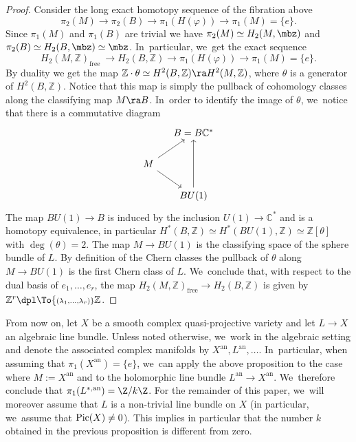 \begin{proof}
Consider the long exact homotopy sequence of the fibration above
\[
\pi_2(M) \to \pi_2(B) \to \pi_1(H(\varphi)) \to \pi_1(M)= \{e\}.
\]
Since $\pi_1(M)$ and $\pi_1(B)$ are trivial we have $\pi_2(M) \simeq H_2(M,\mbz)$ and $\pi_2(B) \simeq H_2(B,\mbz) \simeq \mbz$. In~particular, we~get the exact sequence
\[
H_2(M,\mathbb{Z})_{\text{free}}\ \to H_2(B,\mathbb{Z}) \to \pi_1(H(\varphi)) \to \pi_1(M) = \{e\}.
\]
By duality we get the map $\mathbb{Z} \cdot \theta \simeq H^2(B,\mathbb{Z}) \ra H^2(M,\mathbb{Z})$, where $\theta$ is a generator of $H^2(B,\mathbb{Z})$. Notice that this map is simply the pullback of cohomology classes along the classifying map $M \ra B$. In~order to identify the image of $\theta$, we~notice that there is a commutative diagram
\[
\begin{tikzcd}[column sep=small]
& B = B\mathbb{C}^* \\
M \arrow[ur] \arrow[dr] & \\
& BU(1) \arrow[uu]
\end{tikzcd}
\]
The map $BU(1) \to B$ is induced by the inclusion $U(1) \to \mathbb{C}^*$ and is a homotopy equivalence, in particular $H^*(B, \mathbb{Z}) \simeq H^*(BU(1),\mathbb{Z}) \simeq \mathbb{Z}[\theta]$ with $\deg(\theta) = 2$. The map $M \to BU(1)$ is the classifying space of the sphere bundle of $L$. By definition of the Chern classes the pullback of $\theta$ along $M \to BU(1)$ is the first Chern class of $L$. We~conclude that, with respect to the dual basis of $e_1,\ldots, e_r$, the map $H_2(M,\mathbb{Z})_{\text{free}} \to H_2(B,\mathbb{Z})$ is given by $\mathbb{Z}^r \dpl\To{\scriptstyle(\lambda_1, \ldots, \lambda_r)} \mathbb{Z}$.
\end{proof}

From now on, let $X$ be a smooth complex quasi-projective variety and let $L \to X$ an algebraic line bundle. Unless noted otherwise, we~work in the algebraic setting and denote the associated complex manifolds by $X^\mathrm{an}, L^\mathrm{an},\dots$. In~particular, when assuming that $\pi_1(X^\mathrm{an})=\{e\}$, we~can apply the above proposition to the case where $M:=X^\mathrm{an}$ and to the holomorphic line bundle $L^\mathrm{an}\to X^\mathrm{an}$. We~therefore conclude that $\pi_1(L^{*,\mathrm{an}})=\Z/k\Z$. For the remainder of this paper, we~will moreover assume that $L$ is a non-trivial line bundle on $X$ (in particular, we~assume that $\textup{Pic}(X)\neq 0$). This implies in particular that the number $k$ obtained in the previous proposition is different from zero.

